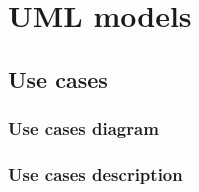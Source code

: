 \section{UML models}

\subsection{Use cases}

\subsubsection{Use cases diagram}

\clearpage
\subsubsection{Use cases description}
